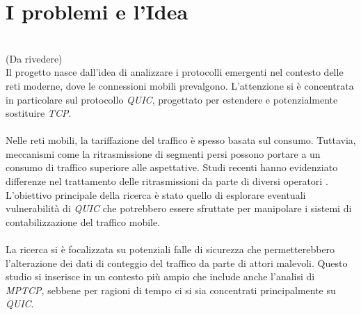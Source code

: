 \section{I problemi e l'Idea}
~\\
(Da rivedere)\\
\indent Il progetto nasce dall'idea di analizzare i protocolli emergenti nel contesto delle reti moderne, dove le connessioni mobili prevalgono. 
L'attenzione si è concentrata in particolare sul protocollo \emph{QUIC}, progettato per estendere e potenzialmente sostituire \emph{TCP}.
\\\\
Nelle reti mobili, la tariffazione del traffico è spesso basata sul consumo. 
Tuttavia, meccanismi come la ritrasmissione di segmenti persi possono portare a un consumo di traffico superiore alle aspettative. 
Studi recenti hanno evidenziato differenze nel trattamento delle ritrasmissioni da parte di diversi operatori \cite{article:cellular}.
L'obiettivo principale della ricerca è stato quello di esplorare eventuali vulnerabilità di \emph{QUIC} che potrebbero essere sfruttate per manipolare i sistemi di contabilizzazione del traffico mobile.
\\\\
La ricerca si è focalizzata su potenziali falle di sicurezza che permetterebbero l'alterazione dei dati di conteggio del traffico da parte di attori malevoli.
Questo studio si inserisce in un contesto più ampio che include anche l'analisi di \emph{MPTCP}, sebbene per ragioni di tempo ci si sia concentrati principalmente su \emph{QUIC}. 



